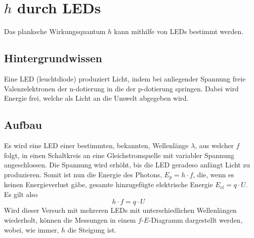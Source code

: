 \documentclass{article}
\begin{document}
\section{$h$ durch LEDs} 
Das planksche Wirkungsquantum $h$ kann mithilfe von LEDs bestimmt werden.
 
\subsection{Hintergrundwissen} 
Eine LED (leuchtdiode) produziert Licht, indem bei anliegender Spannung freie Valenzelektronen der n-dotierung in die  der p-dotierung springen. Dabei wird Energie frei, welche als Licht an die Umwelt abgegeben wird. 
 
\subsection{Aufbau}
Es wird eine LED einer bestimmten, bekannten, Wellenlänge $\lambda$, aus welcher $f$ folgt, in einen Schaltkreis an eine Gleichstromquelle mit variabler Spannung angeschlossen. Die Spannung wird erhöht, bis die LED geradeso anfängt Licht zu produzieren. Somit ist nun die Energie des Photons, $E_{p} = h \cdot f$, die, wenn es keinen Energieverlust gäbe, gesamte hinzugefügte elektrische Energie $E_{el} = q \cdot U$. Es gilt also
\[
 h \cdot f = q \cdot U
\]
Wird dieser Versuch mit mehreren LEDs mit unterschiedlichen Wellenlängen wiederholt, können die Messungen in einem $f$-$E$-Diagramm dargestellt werden, wobei, wie immer, $h$ die Steigung ist. 
\end{document}
